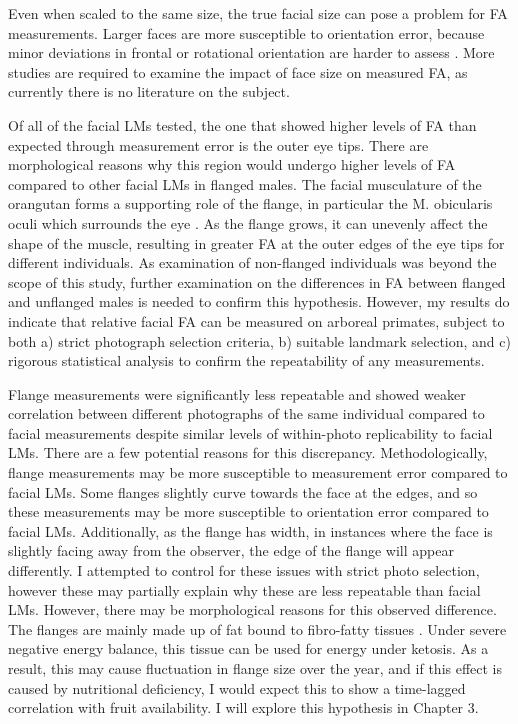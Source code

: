 Even when scaled to the same size, the true facial size can pose a problem for FA measurements. Larger faces are more susceptible to orientation error, because minor deviations in frontal or rotational orientation are harder to assess \citep{Boulton.2013}. More studies are required to examine the impact of face size on measured FA, as currently there is no literature on the subject.

Of all of the facial LMs tested, the one that showed higher levels of FA than expected through measurement error is the outer eye tips. There are morphological reasons why this region would undergo higher levels of FA compared to other facial LMs in flanged males. The facial musculature of the orangutan forms a supporting role of the flange, in particular the M. obicularis oculi which surrounds the eye \citep{Winkler.1989}. As the flange grows, it can unevenly affect the shape of the muscle, resulting in greater FA at the outer edges of the eye tips for different individuals. As examination of non-flanged individuals was beyond the scope of this study, further examination on the differences in FA between flanged and unflanged males is needed to confirm this hypothesis. However, my results do indicate that relative facial FA can be measured on arboreal primates, subject to both a) strict photograph selection criteria, b) suitable landmark selection, and c) rigorous statistical analysis to confirm the repeatability of any measurements.

Flange measurements were significantly less repeatable and showed weaker correlation between different photographs of the same individual compared to facial measurements despite similar levels of within-photo replicability to facial LMs. There are a few potential reasons for this discrepancy. Methodologically, flange measurements may be more susceptible to measurement error compared to facial LMs. Some flanges slightly curve towards the face at the edges, and so these measurements may be more susceptible to orientation error compared to facial LMs. Additionally, as the flange has width, in instances where the face is slightly facing away from the observer, the edge of the flange will appear differently. I attempted to control for these issues with strict photo selection, however these may partially explain why these are less repeatable than facial LMs. However, there may be morphological reasons for this observed difference. The flanges are mainly made up of fat bound to fibro-fatty tissues \citep{Winkler.1989}. Under severe negative energy balance, this tissue can be used for energy under ketosis. As a result, this may cause fluctuation in flange size over the year, and if this effect is caused by nutritional deficiency, I would expect this to show a time-lagged correlation with fruit availability. I will explore this hypothesis in Chapter 3. 


